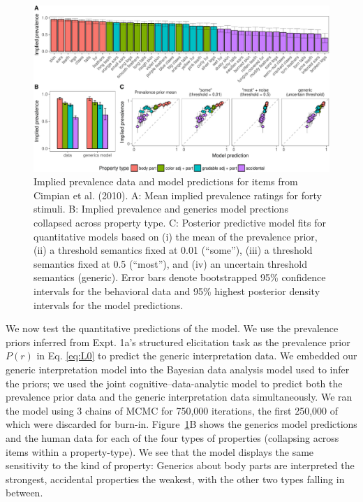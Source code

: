 \documentclass[floatsintext,doc]{apa6}
\theoremstyle{definition}
\theoremstyle{definition}
\theoremstyle{definition}
\theoremstyle{remark}
\begin{document}
\begin{figure}
\centering
\includegraphics{genint_files/figure-latex/cimpian-modelingResults-1.pdf}
\caption{\label{fig:cimpian-modelingResults}Implied prevalence data and
model predictions for items from Cimpian et al. (2010). A: Mean implied
prevalence ratings for forty stimuli. B: Implied prevalence and generics
model prections collapsed across property type. C: Posterior predictive
model fits for quantitative models based on (i) the mean of the
prevalence prior, (ii) a threshold semantics fixed at 0.01
(\enquote{some}), (iii) a threshold semantics fixed at 0.5
(\enquote{most}), and (iv) an uncertain threshold semantics (generic).
Error bars denote bootstrapped 95\% confidence intervals for the
behavioral data and 95\% highest posterior density intervals for the
model predictions.}
\end{figure}

We now test the quantitative predictions of the model. We use the
prevalence priors inferred from Expt. 1a's structured elicitation task
as the prevalence prior \(P(r)\) in Eq. \ref{eq:L0} to predict the
generic interpretation data. We embedded our generic interpretation
model into the Bayesian data analysis model used to infer the priors; we
used the joint cognitive--data-analytic model to predict both the
prevalence prior data and the generic interpretation data
simultaneously. 
We ran the model using 3 chains of MCMC for 750,000 iterations, the first 250,000 of which were
discarded for burn-in. Figure~\ref{fig:cimpian-modelingResults}B shows
the generics model predictions and the human data for each of the four
types of properties (collapsing across items within a property-type). We
see that the model displays the same sensitivity to the kind of
property: Generics about body parts are interpreted the strongest,
accidental properties the weakest, with the other two types falling in
between.
\end{document}
